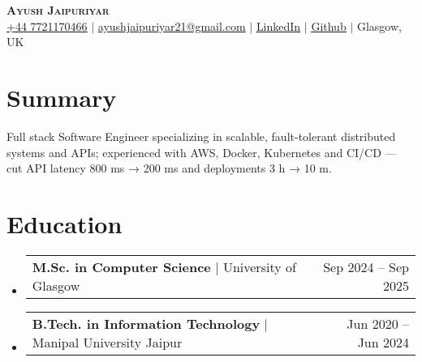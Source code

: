 \documentclass[a4paper,11pt]{article}
\makeatletter
\newcommand{\resumeEducationEntry}[3]{
    \vspace{-2pt}\item
    \begin{tabular*}{0.97\textwidth}{l@{\extracolsep{\fill}}r}
            \textbf{#1} $|$ #2 & #3 \\
    \end{tabular*}\vspace{-7pt}
}
\newcommand{\resumeSubHeadingListStart}{\begin{itemize}[leftmargin=5pt, label={}]}
\newcommand{\resumeSubHeadingListEnd}{\end{itemize}}
\makeatother
\begin{document}
\vspace*{-30pt}
\begin{center}
    \textbf{\Huge \scshape Ayush Jaipuriyar} \\ \vspace{4pt}
    \small \href{tel:+447721170466}{\underline{+44 7721170466}} $|$ \href{mailto:ayushjaipuriyar21@gmail.com}{\underline{ayushjaipuriyar21@gmail.com}} $|$
    \href{https://www.linkedin.com/in/ayushjaipuriyar}{\underline{LinkedIn}} $|$
    \href{https://github.com/ayushjaipuriyar/}{\underline{Github}} $|$ Glasgow, UK
\end{center}
\section{Summary}
\noindent
Full stack Software Engineer specializing in scalable, fault-tolerant distributed systems and APIs; experienced with AWS, Docker, Kubernetes and CI/CD — cut API latency 800 ms → 200 ms and deployments 3 h → 10 m.
\section{Education}
\resumeSubHeadingListStart
\resumeEducationEntry{M.Sc. in Computer Science}{University of Glasgow}{Sep 2024 -- Sep 2025}
\resumeEducationEntry{B.Tech. in Information Technology}{Manipal University Jaipur}{Jun 2020 -- Jun 2024}
\resumeSubHeadingListEnd


\end{document}
